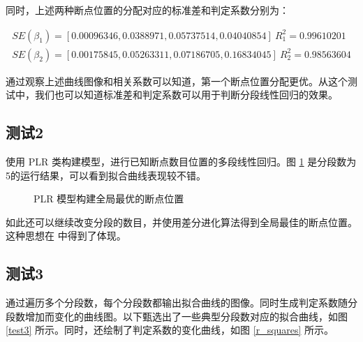 同时，上述两种断点位置的分配对应的标准差和判定系数分别为：

\[\begin{aligned}
    SE(\beta_1)=[0.00096346,0.0388971,0.05737514,0.04040854]~
    R^2_1=0.99610201
    \\
    SE(\beta_2)=[0.00175845,0.05263311,0.07186705,0.16834045]~
    R^2_2=0.98563604
    \end{aligned}\]

通过观察上述曲线图像和相关系数可以知道，第一个断点位置分配更优。从这个测试中，我们也可以知道标准差和判定系数可以用于判断分段线性回归的效果。

\subsection{测试2}

使用 PLR 类构建模型，进行已知断点数目位置的多段线性回归。图 \ref{image03} 是分段数为5的运行结果，可以看到拟合曲线表现较不错。

\begin{figure}[H]
    \caption{PLR 模型构建全局最优的断点位置}
    \label{image03}      
\end{figure}

如此还可以继续改变分段的数目，并使用差分进化算法得到全局最佳的断点位置。这种思想在  中得到了体现。


\subsection{测试3\label{test3}}

通过遍历多个分段数，每个分段数都输出拟合曲线的图像。同时生成判定系数随分段数增加而变化的曲线图。以下甄选出了一些典型分段数对应的拟合曲线，如图 \ref{test3} 所示。同时，还绘制了判定系数的变化曲线，如图 \ref{r_squares} 所示。

